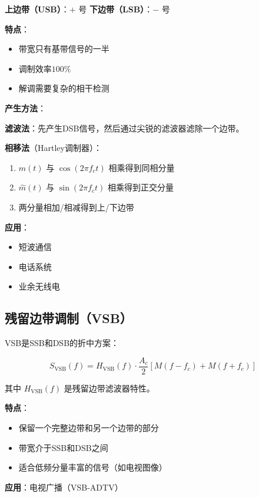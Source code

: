 \textbf{上边带（USB）}：$+$ 号
\textbf{下边带（LSB）}：$-$ 号

\textbf{特点}：
\begin{itemize}
    \item 带宽只有基带信号的一半
    \item 调制效率$100\%$
    \item 解调需要复杂的相干检测
\end{itemize}

\textbf{产生方法}：

\textbf{滤波法}：先产生DSB信号，然后通过尖锐的滤波器滤除一个边带。

\textbf{相移法}（Hartley调制器）：
\begin{enumerate}
    \item $m(t)$ 与 $\cos(2\pi f_c t)$ 相乘得到同相分量
    \item $\hat{m}(t)$ 与 $\sin(2\pi f_c t)$ 相乘得到正交分量
    \item 两分量相加/相减得到上/下边带
\end{enumerate}

\textbf{应用}：
\begin{itemize}
    \item 短波通信
    \item 电话系统
    \item 业余无线电
\end{itemize}

\subsection{残留边带调制（VSB）}
\label{sec:vsb_modulation}

VSB是SSB和DSB的折中方案：

\begin{equation}
    S_{\text{VSB}}(f) = H_{\text{VSB}}(f) \cdot \frac{A_c}{2}[M(f-f_c) + M(f+f_c)]
\end{equation}

其中 $H_{\text{VSB}}(f)$ 是残留边带滤波器特性。

\textbf{特点}：
\begin{itemize}
    \item 保留一个完整边带和另一个边带的部分
    \item 带宽介于SSB和DSB之间
    \item 适合低频分量丰富的信号（如电视图像）
\end{itemize}

\textbf{应用}：电视广播（VSB-ADTV）

